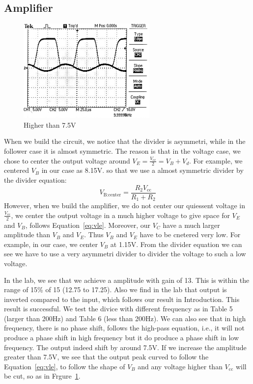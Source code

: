 \documentclass[aps,prl,reprint]{revtex4-1}
\newcommand{\vcc}{V_\text{cc}}
\begin{document}
\subsection{Amplifier}
\begin{figure}[b]
    \centering
    \includegraphics[height=2in]{image/amplabpic.pdf}
    \caption{Higher than 7.5V}
    \label{fig:ampLabPic}
\end{figure}
When we build the circuit, we notice that the divider is asymmetri, while in the follower case it is almost symmetric. The reason is that in the voltage case, we chose to center the output voltage around $V_E = \frac{\vcc}{2} = V_B + V_d$. For example, we centered $V_B$ in our case as 8.15V. so that we use a almost symmetric divider by the divider equation:
\[
V_\text{B:center} = \frac{R_2 \vcc}{R_1 + R_2}
\]
However, when we build the amplifier, we do not center our quiessent voltage in $\frac{\vcc}{2}$, we center the output voltage in a much higher voltage to give space for $V_E$ and $V_B$, follows Equation~\ref{eq:vle}. Moreover, our $V_C$ have a much larger amplitude than $V_B$ and $V_E$. Thus $V_B$ and $V_E$ have to be cnetered very low. For example, in our case, we center $V_B$ at 1.15V. From the divider equation we can see we have to use a very asymmetri divider to divider the voltage to such a low voltage.

In the lab, we see that we achieve a amplitude with gain of 13. This is within the range of 15\% of 15 (12.75 to 17.25). Also we find in the lab that output is inverted compared to the input, which follows our result in Introduction. This result is successful. We test the divice with different frequency as in Table 5 (larger than 200Hz) and Table 6 (less than 200Hz). We can also see that in high frequency, there is no phase shift, follows the high-pass equation, i.e., it will not produce a phase shift in high frequency but it do produce a phase shift in low frequency. The output indeed shift by around 7.5V. If we increase the amplitude greater than 7.5V, we see that the output peak curved to follow the Equation~\ref{eq:vle}, to follow the shape of $V_B$ and any voltage higher than $\vcc$ will be cut, so as in Frgure~\ref{fig:ampLabPic}. 
\end{document}
